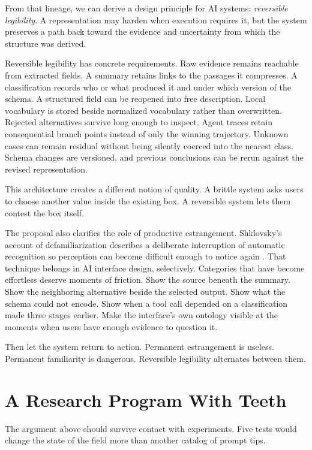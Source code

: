\documentclass[11pt]{article}
\newcommand{\term}[1]{\textit{#1}}
\begin{document}
From that lineage, we can derive a design principle for AI systems: \term{reversible legibility}. A representation may harden when execution requires it, but the system preserves a path back toward the evidence and uncertainty from which the structure was derived.

Reversible legibility has concrete requirements. Raw evidence remains reachable from extracted fields. A summary retains links to the passages it compresses. A classification records who or what produced it and under which version of the schema. A structured field can be reopened into free description. Local vocabulary is stored beside normalized vocabulary rather than overwritten. Rejected alternatives survive long enough to inspect. Agent traces retain consequential branch points instead of only the winning trajectory. Unknown cases can remain residual without being silently coerced into the nearest class. Schema changes are versioned, and previous conclusions can be rerun against the revised representation.

This architecture creates a different notion of quality. A brittle system asks users to choose another value inside the existing box. A reversible system lets them contest the box itself.

The proposal also clarifies the role of productive estrangement. Shklovsky's account of defamiliarization describes a deliberate interruption of automatic recognition so perception can become difficult enough to notice again \citep{shklovsky1965art}. That technique belongs in AI interface design, selectively. Categories that have become effortless deserve moments of friction. Show the source beneath the summary. Show the neighboring alternative beside the selected output. Show what the schema could not encode. Show when a tool call depended on a classification made three stages earlier. Make the interface's own ontology visible at the moments when users have enough evidence to question it.

Then let the system return to action. Permanent estrangement is useless. Permanent familiarity is dangerous. Reversible legibility alternates between them.

\section{A Research Program With Teeth}

The argument above should survive contact with experiments. Five tests would change the state of the field more than another catalog of prompt tips.
\end{document}

